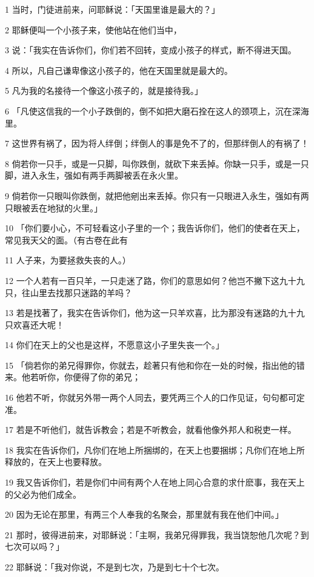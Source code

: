 \par 1 当时，门徒进前来，问耶稣说：「天国里谁是最大的？」
\par 2 耶稣便叫一个小孩子来，使他站在他们当中，
\par 3 说：「我实在告诉你们，你们若不回转，变成小孩子的样式，断不得进天国。
\par 4 所以，凡自己谦卑像这小孩子的，他在天国里就是最大的。
\par 5 凡为我的名接待一个像这小孩子的，就是接待我。」
\par 6 「凡使这信我的一个小子跌倒的，倒不如把大磨石拴在这人的颈项上，沉在深海里。
\par 7 这世界有祸了，因为将人绊倒；绊倒人的事是免不了的，但那绊倒人的有祸了！
\par 8 倘若你一只手，或是一只脚，叫你跌倒，就砍下来丢掉。你缺一只手，或是一只脚，进入永生，强如有两手两脚被丢在永火里。
\par 9 倘若你一只眼叫你跌倒，就把他剜出来丢掉。你只有一只眼进入永生，强如有两只眼被丢在地狱的火里。」
\par 10 「你们要小心，不可轻看这小子里的一个；我告诉你们，他们的使者在天上，常见我天父的面。（有古卷在此有
\par 11 人子来，为要拯救失丧的人。）
\par 12 一个人若有一百只羊，一只走迷了路，你们的意思如何？他岂不撇下这九十九只，往山里去找那只迷路的羊吗？
\par 13 若是找著了，我实在告诉你们，他为这一只羊欢喜，比为那没有迷路的九十九只欢喜还大呢！
\par 14 你们在天上的父也是这样，不愿意这小子里失丧一个。」
\par 15 「倘若你的弟兄得罪你，你就去，趁著只有他和你在一处的时候，指出他的错来。他若听你，你便得了你的弟兄；
\par 16 他若不听，你就另外带一两个人同去，要凭两三个人的口作见证，句句都可定准。
\par 17 若是不听他们，就告诉教会；若是不听教会，就看他像外邦人和税吏一样。
\par 18 我实在告诉你们，凡你们在地上所捆绑的，在天上也要捆绑；凡你们在地上所释放的，在天上也要释放。
\par 19 我又告诉你们，若是你们中间有两个人在地上同心合意的求什麽事，我在天上的父必为他们成全。
\par 20 因为无论在那里，有两三个人奉我的名聚会，那里就有我在他们中间。」
\par 21 那时，彼得进前来，对耶稣说：「主啊，我弟兄得罪我，我当饶恕他几次呢？到七次可以吗？」
\par 22 耶稣说：「我对你说，不是到七次，乃是到七十个七次。

